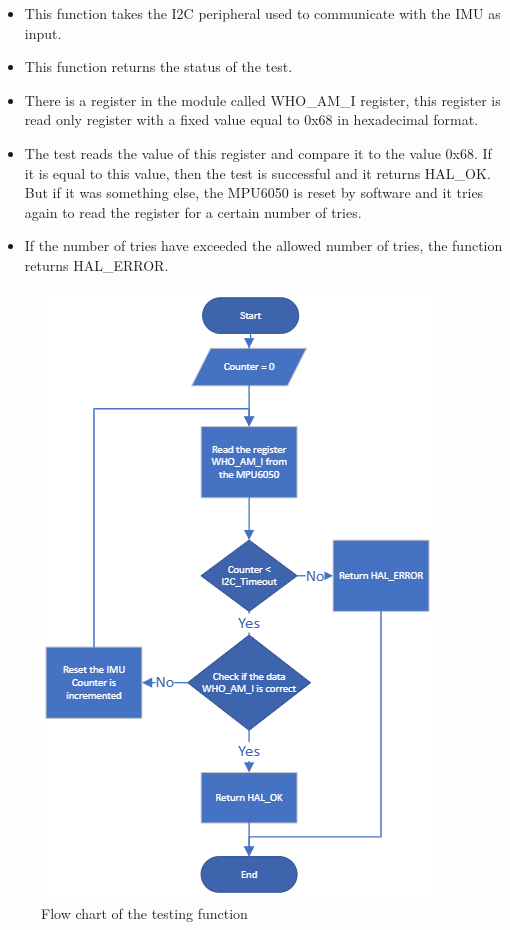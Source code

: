 \begin{enumerate}
    
    \begin{itemize}
        \item This function takes the I2C peripheral used to communicate with the IMU as input.
        \item This function returns the status of the test.
        \item There is a register in the module called WHO\_AM\_I register, this register is read only register with a fixed value equal to 0x68 in hexadecimal format.
        \item The test reads the value of this register and compare it to the value 0x68. If it is equal to this value, then the test is successful and it returns HAL\_OK. But if it was something else, the MPU6050 is reset by software and  it tries again to read the register for a certain number of tries.
        \item If the number of tries have exceeded the allowed number of tries, the function returns HAL\_ERROR.
    \end{itemize}
    \begin{figure}[h]
    \centering
    \includegraphics{figure/5-5.png}
    \caption{Flow chart of the testing function}
    \end{figure}
\end{enumerate}
\clearpage
